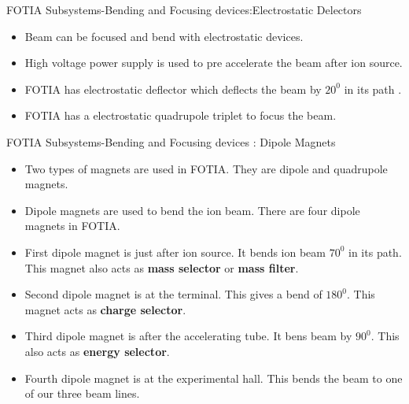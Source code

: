 \documentclass[11pt]{beamer}
\begin{document}
\begin{frame}{FOTIA Subsystems-Bending and Focusing devices:Electrostatic Delectors}

  \begin{itemize}
   
   
    \item Beam can be focused and bend with electrostatic devices.
    \item High voltage power supply is used to pre accelerate the beam after ion source.
    \item FOTIA has electrostatic deflector which deflects the beam by $20^0$ in its path .
    \item FOTIA has a electrostatic quadrupole triplet to focus the beam.
    
   \end{itemize}

\end{frame}


\begin{frame}{FOTIA Subsystems-Bending and Focusing devices : Dipole Magnets}

  \begin{itemize}
   
    \item Two types of magnets are used in FOTIA. They are dipole and quadrupole magnets.
    \item Dipole magnets are used to bend the ion beam. There are four dipole magnets in FOTIA.
    \item First dipole magnet is just after ion source. It bends ion beam $70^0$ in its path. This magnet also acts as \textbf{mass selector} or \textbf{mass filter}.
    \item Second dipole magnet is at the terminal. This gives a bend of $180^0$. This magnet acts as \textbf{charge selector}.
    \item Third dipole magnet is after the accelerating tube. It bens beam by $90^0$. This also acts as \textbf{energy selector}.
    \item Fourth dipole magnet is at the experimental hall. This bends the beam to one of our three beam lines.
   
   \end{itemize}

\end{frame}
\end{document}
